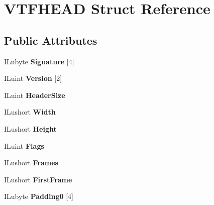 \hypertarget{structVTFHEAD}{}\section{V\+T\+F\+H\+E\+AD Struct Reference}
\label{structVTFHEAD}
\subsection*{Public Attributes}
\begin{DoxyCompactItemize}
\item 
\mbox{\label{structVTFHEAD_a3f0bfab1a6b9d7f797fdbcbe9b09eac8}} 
I\+Lubyte {\bfseries Signature} \mbox{[}4\mbox{]}
\item 
\mbox{\label{structVTFHEAD_a49327a4482fbab54595f1b0fffa80b4d}} 
I\+Luint {\bfseries Version} \mbox{[}2\mbox{]}
\item 
\mbox{\label{structVTFHEAD_af6bbb069561191aca7fcb8e949bf9465}} 
I\+Luint {\bfseries Header\+Size}
\item 
\mbox{\label{structVTFHEAD_ad6f34374e9c49551d44fdf1a2aea2b12}} 
I\+Lushort {\bfseries Width}
\item 
\mbox{\label{structVTFHEAD_a900af0cae37a40f314eed027732c2f17}} 
I\+Lushort {\bfseries Height}
\item 
\mbox{\label{structVTFHEAD_ad6a098c67f0c273a63ce2edb40f34efd}} 
I\+Luint {\bfseries Flags}
\item 
\mbox{\label{structVTFHEAD_ab00bc13b0cd5016a609211f5545eb697}} 
I\+Lushort {\bfseries Frames}
\item 
\mbox{\label{structVTFHEAD_a517ef718703f455286402bc52784b2bf}} 
I\+Lushort {\bfseries First\+Frame}
\item 
\mbox{\label{structVTFHEAD_aed3a5c105316033e84d44924866ee048}} 
I\+Lubyte {\bfseries Padding0} \mbox{[}4\mbox{]}
\item 
\mbox{\label{structVTFHEAD_af724971dc9f4b2a9836644a2bee1d427}} 

\end{DoxyCompactItemize}
